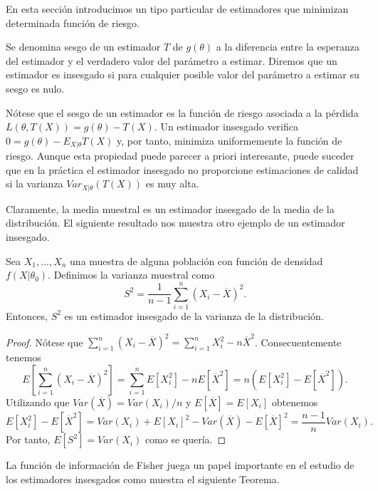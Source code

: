 \documentclass{article}
\begin{document}
    En esta sección introducimos un tipo particular de estimadores que minimizan determinada función de riesgo.

    \begin{definition}
        Se denomina sesgo de un estimador $T$ de $g(\theta)$ a la diferencia entre la esperanza del estimador y el verdadero valor del parámetro a estimar. Diremos que un estimador es insesgado si para cualquier posible valor del parámetro a estimar su sesgo es nulo.
    \end{definition}

    Nótese que el sesgo de un estimador es la función de riesgo asociada a la pérdida $L(\theta,T(X)) = g(\theta) - T(X)$. Un estimador insesgado verifica $0 = g(\theta) - E_{X|\theta} T(X)$ y, por tanto, minimiza uniformemente la función de riesgo. Aunque esta propiedad puede parecer a priori interesante, puede suceder que en la práctica el estimador insesgado no proporcione estimaciones de calidad si la varianza $Var_{X|\theta}(T(X))$ es muy alta.

    Claramente, la media muestral es un estimador insesgado de la media de la distribución. El siguiente resultado nos muestra otro ejemplo de un estimador insesgado.

    \begin{prop}
        Sea $X_1, \ldots, X_n$ una muestra de alguna población con función de densidad $f(X | \theta_0)$. Definimos la varianza muestral como
        \[S^2 = \frac{1}{n-1}\sum_{i = 1}^n(X_i - \overline{X})^2.\]
        Entonces, $S^2$ es un estimador insesgado de la varianza de la distribución.
    \end{prop}
    \begin{proof}
        Nótese que $\sum_{i = 1}^n(X_i - \overline{X})^2 = \sum_{i = 1}^nX_i^2 - n\overline{X}^2$. Consecuentemente tenemos
        \[E\left[\sum_{i = 1}^n(X_i - \overline{X})^2\right] = \sum_{i = 1}^nE\left[X_i^2\right] -     nE[\overline{X}^2] = n(E\left[X_i^2\right] - E[\overline{X}^2]).\]
        Utilizando que $Var(\overline{X}) = Var(X_i) / n$ y $E[\overline{X}] = E[X_i]$ obtenemos
        \[E[X_i^2] - E[\overline{X}^2] = Var(X_i) + E[X_i]^2 - Var(\overline{X}) - E[\overline{X}]^2 = \frac{n-1}{n} Var(X_i).\]
        Por tanto, $E[S^2] = Var(X_i)$ como se quería.
    \end{proof}

    La función de información de Fisher juega un papel importante en el estudio de los estimadores insesgados como muestra el siguiente Teorema.
\end{document}
